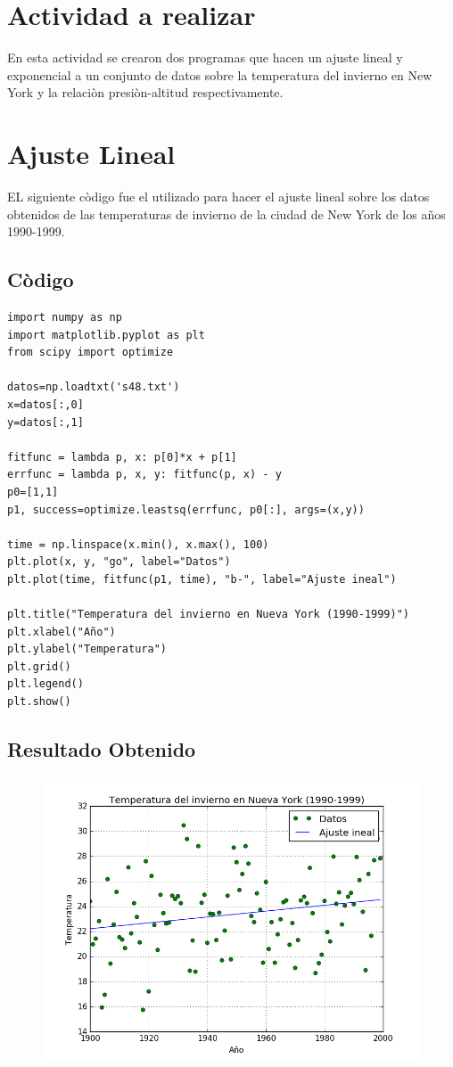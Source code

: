 \documentclass[12pt]{article}
\begin{document}
\section{Actividad a realizar}

En esta actividad se crearon dos programas que hacen un ajuste lineal y exponencial a un conjunto de datos sobre la temperatura del invierno en New York y la relaciòn presiòn-altitud respectivamente. 
 
 
 \section{Ajuste Lineal}
 EL siguiente còdigo fue el utilizado para hacer el ajuste lineal sobre los datos obtenidos de las temperaturas de invierno de la ciudad de New York de los años 1990-1999.
 \subsection{Còdigo}
 \begin{verbatim}
import numpy as np
import matplotlib.pyplot as plt
from scipy import optimize

datos=np.loadtxt('s48.txt')
x=datos[:,0]
y=datos[:,1]

fitfunc = lambda p, x: p[0]*x + p[1]
errfunc = lambda p, x, y: fitfunc(p, x) - y 
p0=[1,1]
p1, success=optimize.leastsq(errfunc, p0[:], args=(x,y))

time = np.linspace(x.min(), x.max(), 100)
plt.plot(x, y, "go", label="Datos") 
plt.plot(time, fitfunc(p1, time), "b-", label="Ajuste ineal")

plt.title("Temperatura del invierno en Nueva York (1990-1999)")
plt.xlabel("Año")
plt.ylabel("Temperatura")
plt.grid()
plt.legend()
plt.show()
\end{verbatim}
\subsection{ Resultado Obtenido}
 \begin{figure}[H]
\centering
\includegraphics[scale=.5]{lineal}
\end{figure}
 
\end{document}
